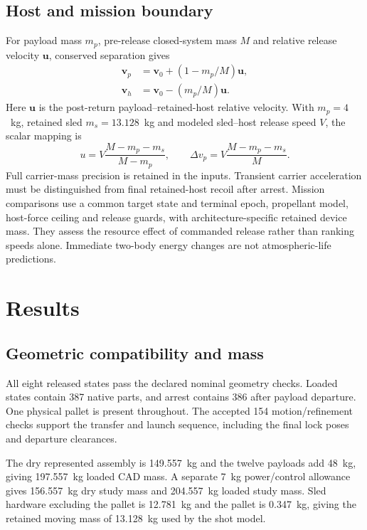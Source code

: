 \documentclass[conference,a4paper]{IEEEtran}
\begin{document}
\subsection{Host and mission boundary}
For payload mass $m_p$, pre-release closed-system mass $M$ and relative release velocity $\mathbf u$, conserved separation gives
\begin{align}
\mathbf v_p&=\mathbf v_0+(1-m_p/M)\mathbf u,\\
\mathbf v_h&=\mathbf v_0-(m_p/M)\mathbf u.
\end{align}
Here $\mathbf u$ is the post-return payload--retained-host relative velocity. With $m_p=4$~kg, retained sled $m_s=13.128$~kg and modeled sled--host release speed $V$, the scalar mapping is
\begin{equation}
u=V\frac{M-m_p-m_s}{M-m_p},\qquad \Delta v_p=V\frac{M-m_p-m_s}{M}.
\end{equation}
Full carrier-mass precision is retained in the inputs. Transient carrier acceleration must be distinguished from final retained-host recoil after arrest. Mission comparisons use a common target state and terminal epoch, propellant model, host-force ceiling and release guards, with architecture-specific retained device mass. They assess the resource effect of commanded release rather than ranking speeds alone. Immediate two-body energy changes are not atmospheric-life predictions.

\section{Results}
\subsection{Geometric compatibility and mass}
All eight released states pass the declared nominal geometry checks. Loaded states contain 387 native parts, and arrest contains 386 after payload departure. One physical pallet is present throughout. The accepted 154 motion/refinement checks support the transfer and launch sequence, including the final lock poses and departure clearances.

The dry represented assembly is 149.557~kg and the twelve payloads add 48~kg, giving 197.557~kg loaded CAD mass. A separate 7~kg power/control allowance gives 156.557~kg dry study mass and 204.557~kg loaded study mass. Sled hardware excluding the pallet is 12.781~kg and the pallet is 0.347~kg, giving the retained moving mass of 13.128~kg used by the shot model.
\end{document}
